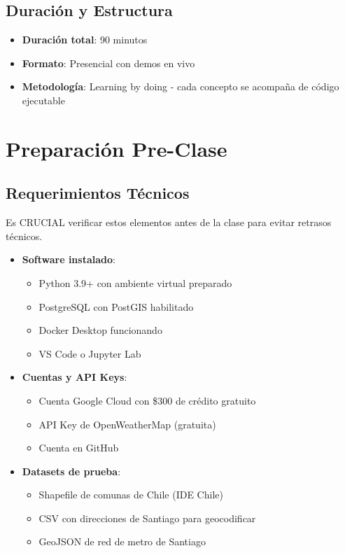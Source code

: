 \documentclass[11pt,a4paper]{article}
\begin{document}
\subsection{Duración y Estructura}
\begin{itemize}
    \item \textbf{Duración total}: 90 minutos
    \item \textbf{Formato}: Presencial con demos en vivo
    \item \textbf{Metodología}: Learning by doing - cada concepto se acompaña de código ejecutable
\end{itemize}

\section{Preparación Pre-Clase}

\subsection{Requerimientos Técnicos}
\begin{alertbox}
Es CRUCIAL verificar estos elementos antes de la clase para evitar retrasos técnicos.
\end{alertbox}

\begin{itemize}
    \item \textbf{Software instalado}:
    \begin{itemize}
        \item Python 3.9+ con ambiente virtual preparado
        \item PostgreSQL con PostGIS habilitado
        \item Docker Desktop funcionando
        \item VS Code o Jupyter Lab
    \end{itemize}
    
    \item \textbf{Cuentas y API Keys}:
    \begin{itemize}
        \item Cuenta Google Cloud con \$300 de crédito gratuito
        \item API Key de OpenWeatherMap (gratuita)
        \item Cuenta en GitHub
    \end{itemize}
    
    \item \textbf{Datasets de prueba}:
    \begin{itemize}
        \item Shapefile de comunas de Chile (IDE Chile)
        \item CSV con direcciones de Santiago para geocodificar
        \item GeoJSON de red de metro de Santiago
    \end{itemize}
\end{itemize}
\end{document}
